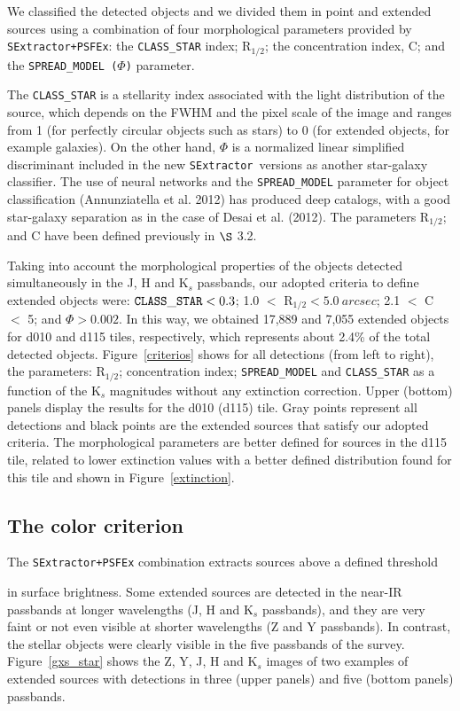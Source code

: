 \documentclass[preprint2]{aastex}
\newcommand{\se}{{\tt SExtractor\ }}
\begin{document}
{ We classified the detected objects and we divided them in point and
  extended sources using a combination of 
four morphological parameters provided by {\tt SExtractor+PSFEx}:  
the {\tt CLASS\_STAR} index; R$_{1/2}$; the concentration index, C; and the {\tt SPREAD\_MODEL ($\Phi$)} parameter.

The {\tt CLASS\_STAR} is a stellarity index associated with the light 
distribution of the source, which depends on the FWHM and the pixel scale of
the 
image and ​​ranges from 1 (for perfectly 
circular objects such as stars) to 0 (for extended objects, for example
galaxies). 
On the other hand, $\Phi$ is a normalized linear 
simplified discriminant included in the new 
\se versions as another star-galaxy classifier. 
The use of neural networks and the {\tt SPREAD\_MODEL} parameter for object 
classification (Annunziatella et al. 2012) has produced deep catalogs,
with a good star-galaxy separation as in the case of Desai et al. (2012).  
The parameters R$_{1/2}$; and C have been defined previously in $\S$ 3.2.

Taking into account the morphological properties of the objects
detected simultaneously in the
J, H and  K$_s$ passbands, our
adopted criteria to define extended objects were: ${\tt CLASS\_STAR} < 0.3$;
1.0 $<$ R$_{1/2} < 5.0~arcsec$; 2.1 $<$ C $<$ 5; 
and $\Phi > 0.002$. In this way, we obtained 17,889 and 7,055 
extended objects for d010 and d115 tiles, respectively, which
represents about 2.4\% of the total detected objects.
Figure~\ref{criterios} shows for all detections (from left to right), 
the parameters: R$_{1/2}$; concentration index; {\tt SPREAD\_MODEL} and
{\tt CLASS\_STAR} as a function of the K$_s$ magnitudes without any extinction
correction.
Upper (bottom) panels display the
results for the d010 (d115) tile.   Gray points represent all detections and
black points are
the extended sources that satisfy our adopted criteria.
The morphological parameters are better defined for sources in the d115 tile, related to 
lower extinction values with a better defined distribution found for this tile and shown in
Figure~\ref{extinction}.


\subsection{The color criterion}

 The {\tt SExtractor+PSFEx} combination extracts sources above  a defined threshold} in surface
  brightness.  Some extended sources are detected in the near-IR passbands at
  longer
wavelengths (J, H and K$_s$ passbands), and they are very faint or not even
visible at shorter wavelengths 
(Z and Y passbands). In contrast, the stellar objects were clearly visible in the 
five passbands of the survey.
Figure~\ref{gxs_star} shows the Z, Y, J, H and K$_s$ images of two
examples of extended sources with detections in three
(upper panels) and five (bottom panels) passbands.
\end{document}

